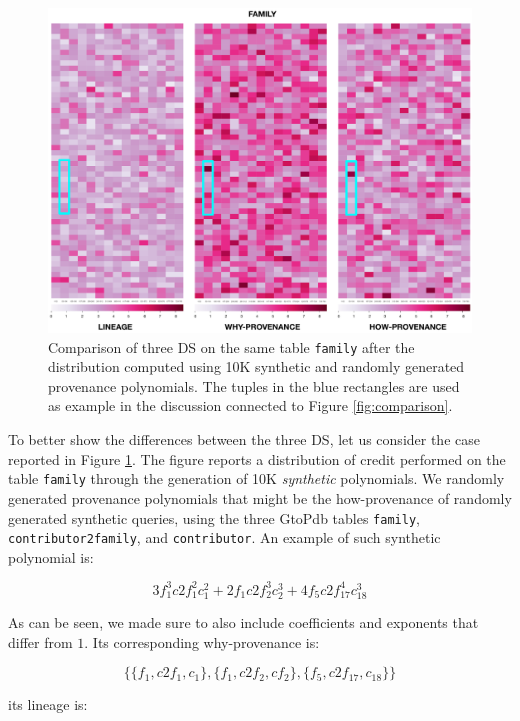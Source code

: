 \begin{figure}[tb]
  \includegraphics[width=1\textwidth]{figures/synthetic_polynomials}
  \caption{Comparison of three DS on the same table \texttt{family} after the distribution computed using 10K synthetic and randomly generated provenance polynomials. The tuples in the blue rectangles are used as example in the discussion connected to Figure \ref{fig:comparison}.}
  \label{figure:comparison_on_synthetic_polynomials_2}
\end{figure}

To better show the differences between the three DS, let us consider the case reported in Figure \ref{figure:comparison_on_synthetic_polynomials_2}. 
The figure reports a distribution of credit performed on the table \texttt{family} through the generation of 10K \emph{synthetic} polynomials. 
We randomly generated provenance polynomials that might be the how-provenance of randomly generated synthetic queries, using the three GtoPdb tables \texttt{family}, \texttt{contributor2family}, and \texttt{contributor}. 
An example of such synthetic polynomial is:

{\footnotesize
\[
3 f_1^3 c2f_1^2 c_1^2 + 2 f_1 c2f_2^3 c_2^3 + 4 f_5 c2f_{17}^4 c_{18}^3
\] }

As can be seen, we made sure to also include coefficients and exponents that differ from $1$.
Its corresponding why-provenance is: 

{\footnotesize
\[
\{ \{f_1, c2f_1, c_1\}, \{f_1, c2f_2, cf_2\}, \{ f_5, c2f_{17}, c_{18}\} \}
\] 
}

its lineage is: 

